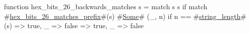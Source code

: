 function hex_bits_26_backwards_matches s = match s {
  s if match #\hyperref[sailRISCVzhexzybitszy26zymatcheszyprefix]{hex\_bits\_26\_matches\_prefix}#(s) {
    #\hyperref[sailRISCVzSome]{Some}# (_, n) if n == #\hyperref[sailRISCVzstringzylength]{string\_length}#(s) => true,
    _ => false
  } => true,
  _ => false
}
